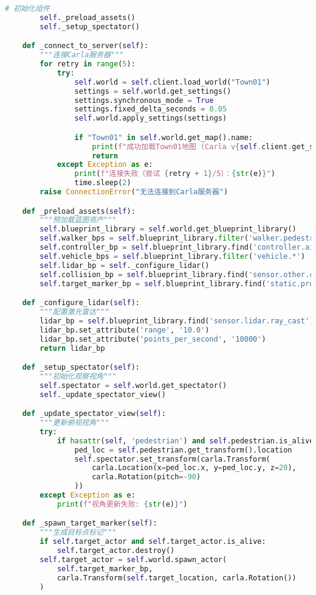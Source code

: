 \begin{lstlisting}[language=Python]
        # 初始化组件
        self._preload_assets()
        self._setup_spectator()

    def _connect_to_server(self):
        """连接Carla服务器"""
        for retry in range(5):
            try:
                self.world = self.client.load_world("Town01")
                settings = self.world.get_settings()
                settings.synchronous_mode = True
                settings.fixed_delta_seconds = 0.05
                self.world.apply_settings(settings)

                if "Town01" in self.world.get_map().name:
                    print(f"成功加载Town01地图 (Carla v{self.client.get_server_version()})")
                    return
            except Exception as e:
                print(f"连接失败（尝试 {retry + 1}/5）：{str(e)}")
                time.sleep(2)
        raise ConnectionError("无法连接到Carla服务器")

    def _preload_assets(self):
        """预加载蓝图资产"""
        self.blueprint_library = self.world.get_blueprint_library()
        self.walker_bps = self.blueprint_library.filter('walker.pedestrian.*')
        self.controller_bp = self.blueprint_library.find('controller.ai.walker')
        self.vehicle_bps = self.blueprint_library.filter('vehicle.*')
        self.lidar_bp = self._configure_lidar()
        self.collision_bp = self.blueprint_library.find('sensor.other.collision')
        self.target_marker_bp = self.blueprint_library.find('static.prop.streetbarrier')

    def _configure_lidar(self):
        """配置激光雷达"""
        lidar_bp = self.blueprint_library.find('sensor.lidar.ray_cast')
        lidar_bp.set_attribute('range', '10.0')
        lidar_bp.set_attribute('points_per_second', '10000')
        return lidar_bp

    def _setup_spectator(self):
        """初始化观察视角"""
        self.spectator = self.world.get_spectator()
        self._update_spectator_view()

    def _update_spectator_view(self):
        """更新俯视视角"""
        try:
            if hasattr(self, 'pedestrian') and self.pedestrian.is_alive:
                ped_loc = self.pedestrian.get_transform().location
                self.spectator.set_transform(carla.Transform(
                    carla.Location(x=ped_loc.x, y=ped_loc.y, z=20),
                    carla.Rotation(pitch=-90)
                ))
        except Exception as e:
            print(f"视角更新失败: {str(e)}")

    def _spawn_target_marker(self):
        """生成目标点标记"""
        if self.target_actor and self.target_actor.is_alive:
            self.target_actor.destroy()
        self.target_actor = self.world.spawn_actor(
            self.target_marker_bp,
            carla.Transform(self.target_location, carla.Rotation())
        )


\end{lstlisting}
